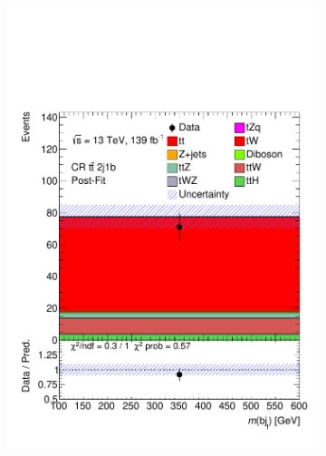 \begin{figure}[!h]
\begin{subfigure}[b]{0.33\linewidth}
   \includegraphics[width=\textwidth]{ubonn-thesis/Chapters/Chapters_08/appendix/data/CR_2j1b_postFit.pdf} 
    \caption{}
  \end{subfigure} 
  \centering
  \begin{subfigure}[b]{0.33\linewidth}

\end{subfigure}
\end{figure}
